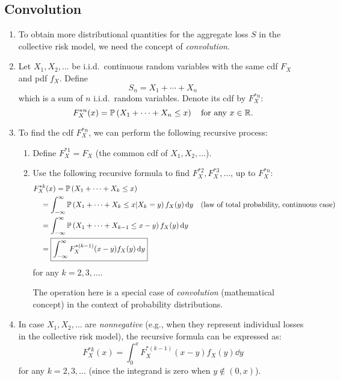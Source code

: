 \subsection{Convolution}
\begin{enumerate}
\item To obtain more distributional quantities for the aggregate loss \(S\) in
the collective risk model, we need the concept of \emph{convolution}.

\item Let \(X_1,X_2,\dotsc\) be i.i.d.\ continuous random variables with the
same cdf \(F_X\) and pdf \(f_X\). Define
\[
S_n=X_1+\dotsb+X_n
\]
which is a sum of \(n\) i.i.d.\ random variables. Denote its cdf by \(F_X^{*n}\):
\[
F_{X}^{*n}(x)=\mathbb{P}\left(X_1+\dotsb+X_n\le x\right)\quad\text{for any \(x\in\mathbb{R}\)}.
\]
\item \label{it:cts-convolution-steps}
To find the cdf \(F_{X}^{*n}\), we can perform the following recursive
process:
\begin{enumerate}
\item Define \(F_{X}^{*1}=F_{X}\) (the common cdf of \(X_1,X_2,\dotsc\)).
\item Use the following recursive formula to find
\(F_X^{*2},F_X^{*3},\dotsc\), up to \(F_X^{*n}\):
\begin{align*}
&F_{X}^{*k}(x)=\mathbb{P}\left(X_1+\dotsb+X_k\le x\right)\\
&\quad=\int_{-\infty}^{\infty}\mathbb{P}\left(X_1+\dotsb+X_k\le x|X_k=y\right)f_{X}(y)\dd{y}&\text{(law of total probability, continuous case)}\\
&\quad=\int_{-\infty}^{\infty}\mathbb{P}\left(X_1+\dotsb+X_{k-1}\le x-y\right)f_{X}(y)\dd{y}\\
&\quad=\boxed{\int_{-\infty}^{\infty}F_{X}^{*(k-1)}(x-y)f_{X}(y)\dd{y}}
\end{align*}
for any \(k=2,3,\dotsc\).

\begin{note}
The operation here is a special case of \emph{convolution} (mathematical
concept) in the context of probability distributions.
\end{note}
\end{enumerate}

\item \label{it:nonneg-cts-convolution-cdf-pdf-fmlas}
In case \(X_1,X_2,\dotsc\) are \emph{nonnegative} (e.g., when they represent
individual losses in the collective risk model), the recursive formula can be
expressed as:
\[
F_{X}^{*k}(x)=\boxed{\int_{0}^{x}F_{X}^{*(k-1)}(x-y)f_X(y)\dd{y}}
\]
for any \(k=2,3,\dotsc\) (since the integrand is zero when \(y\notin(0,x)\)).


\end{enumerate}
